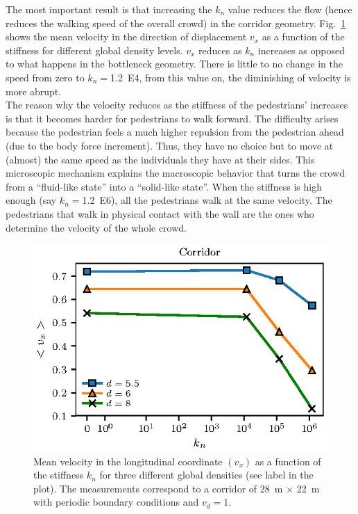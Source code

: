 \documentclass[preprint,12pt]{elsarticle}
\begin{document}
The most important result is that increasing the $k_n$ value reduces the flow (hence reduces the walking speed of the overall crowd) in the corridor geometry. Fig.~\ref{kn_vs_vx_corridor} shows the mean velocity in the direction of displacement $v_x$ as a function of the stiffness for different global density levels. $v_x$ reduces as $k_n$ increases as opposed to what happens in the bottleneck geometry. There is little to no change in the speed from zero to $k_n=$1.2~E4, from this value on, the diminishing of velocity is more abrupt.\\

The reason why the velocity reduces as the stiffness of the pedestrians' increases is that it becomes harder for pedestrians to walk forward. The difficulty arises because the pedestrian feels a much higher repulsion from the pedestrian ahead (due to the body force increment). Thus, they have no choice but to move at (almost) the same speed as the individuals they have at their sides. This microscopic mechanism explains the macroscopic behavior that turns the crowd from a ``fluid-like state'' into a ``solid-like state''. When the stiffness is high enough (say $k_n=$1.2~E6), all the pedestrians walk at the same velocity. The pedestrians that walk in physical contact with the wall are the ones who determine the velocity of the whole crowd.\\

\begin{figure}[htbp!]
\centering
\includegraphics[width=0.7\columnwidth]{./kn_vs_vx_corridor.eps}
\caption{\label{kn_vs_vx_corridor} Mean velocity in the longitudinal coordinate $(v_x)$ as a function of the stiffness $k_n$ for three different global densities (see label in the plot). The measurements correspond to a corridor of 28~m $\times$ 22~m with periodic boundary conditions and $v_d=1$.      }
\end{figure}
\end{document}
